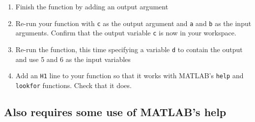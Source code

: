\documentclass{article}
\begin{document}
\begin{enumerate}
\begin{enumerate}
			\item Finish the function by adding an output argument
			\item Re-run your function with \texttt{c} as the output argument and \texttt{a} and \texttt{b} as the input arguments. Confirm that the output variable \texttt{c} is now in your workspace.
			\item Re-run the function, this time specifying a variable \texttt{d} to contain the output and use 5 and 6 as the input variables
			\item Add an \texttt{H1} line to your function so that it works with MATLAB's \texttt{help} and \texttt{lookfor} functions. Check that it does.
		\end{enumerate}	
	\end{enumerate}	
	\subsection*{Also requires some use of MATLAB's help}
\end{document}
